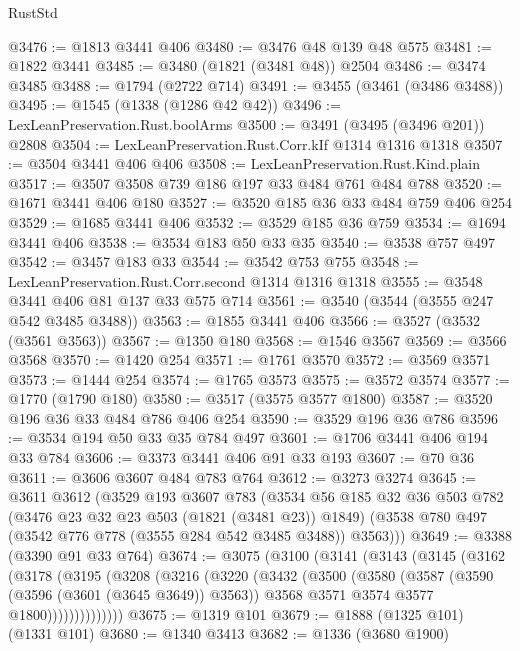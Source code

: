 \begin{lexlean}{RustStd}
\begin{coremodule}
@3476 := @1813 @3441 @406
@3480 := @3476 @48 @139 @48 @575
@3481 := @1822 @3441
@3485 := @3480 (@1821 (@3481 @48)) @2504
@3486 := @3474 @3485
@3488 := @1794 (@2722 @714)
@3491 := @3455 (@3461 (@3486 @3488))
@3495 := @1545 (@1338 (@1286 @42 @42))
@3496 := LexLeanPreservation.Rust.boolArms
@3500 := @3491 (@3495 (@3496 @201)) @2808
@3504 := LexLeanPreservation.Rust.Corr.kIf @1314 @1316 @1318
@3507 := @3504 @3441 @406 @406
@3508 := LexLeanPreservation.Rust.Kind.plain
@3517 := @3507 @3508 @739 @186 @197 @33 @484 @761 @484 @788
@3520 := @1671 @3441 @406 @180
@3527 := @3520 @185 @36 @33 @484 @759 @406 @254
@3529 := @1685 @3441 @406
@3532 := @3529 @185 @36 @759
@3534 := @1694 @3441 @406
@3538 := @3534 @183 @50 @33 @35
@3540 := @3538 @757 @497
@3542 := @3457 @183 @33
@3544 := @3542 @753 @755
@3548 := LexLeanPreservation.Rust.Corr.second @1314 @1316 @1318
@3555 := @3548 @3441 @406 @81 @137 @33 @575 @714
@3561 := @3540 (@3544 (@3555 @247 @542 @3485 @3488))
@3563 := @1855 @3441 @406
@3566 := @3527 (@3532 (@3561 @3563))
@3567 := @1350 @180
@3568 := @1546 @3567
@3569 := @3566 @3568
@3570 := @1420 @254
@3571 := @1761 @3570
@3572 := @3569 @3571
@3573 := @1444 @254
@3574 := @1765 @3573
@3575 := @3572 @3574
@3577 := @1770 (@1790 @180)
@3580 := @3517 (@3575 @3577 @1800)
@3587 := @3520 @196 @36 @33 @484 @786 @406 @254
@3590 := @3529 @196 @36 @786
@3596 := @3534 @194 @50 @33 @35 @784 @497
@3601 := @1706 @3441 @406 @194 @33 @784
@3606 := @3373 @3441 @406 @91 @33 @193
@3607 := @70 @36
@3611 := @3606 @3607 @484 @783 @764
@3612 := @3273 @3274
@3645 := @3611
    @3612
    (@3529
      @193
      @3607
      @783
      (@3534
        @56
        @185
        @32
        @36
        @503
        @782
        (@3476 @23 @32 @23 @503 (@1821 (@3481 @23)) @1849)
        (@3538 @780 @497 (@3542 @776 @778 (@3555 @284 @542 @3485 @3488)) @3563)))
@3649 := @3388 (@3390 @91 @33 @764)
@3674 := @3075
    (@3100
      (@3141
        (@3143
          (@3145
            (@3162
              (@3178
                (@3195
                  (@3208
                    (@3216
                      (@3220
                        (@3432
                          (@3500
                            (@3580
                              (@3587
                                (@3590 (@3596 (@3601 (@3645 @3649)) @3563))
                                @3568
                                @3571
                                @3574
                                @3577
                                @1800))))))))))))))
@3675 := @1319 @101
@3679 := @1888 (@1325 @101) (@1331 @101)
@3680 := @1340 @3413
@3682 := @1336 (@3680 @1900)

\end{coremodule}
\end{lexlean}

